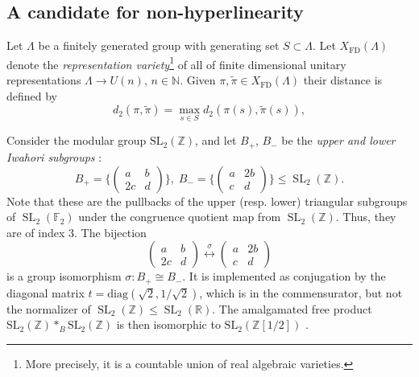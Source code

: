 \documentclass[11pt]{amsart}
\DeclareMathOperator{\SL}{SL}
\newcommand{\R}{{\mathbb{R}}}
\newcommand{\N}{{\mathbb{N}}}
\newcommand{\Z}{{\mathbb{Z}}}
\theoremstyle{definition}
\theoremstyle{remark}
\theoremstyle{definition}
\begin{document}
\subsection*{A candidate for non-hyperlinearity} \label{sec:prologue}





Let $\Lambda$ be a finitely generated group with generating set $S \subset \Lambda$. Let $X_{\mathrm{FD}}(\Lambda)$ denote the \emph{representation variety}\footnote{More precisely, it is  a countable union of real algebraic varieties.} of all of finite
dimensional unitary representations $\Lambda\to U(n)$, $n\in \N$.%
Given $\pi, \tilde \pi \in X_{\mathrm{FD}}(\Lambda)$ their distance is defined by
\[
       d_2(\pi,\tilde{\pi})= \max_{s\in S} d_2(\pi(s), \tilde\pi(s)),
\]


Consider the modular group $ \mathrm{SL}_{2}(\Z)$, and
let ${B}_{+}$, ${B}_{-}$ be the \emph{upper and lower Iwahori subgroups} \cite[Section 1.2]{serre2002trees}:
$${B}_+ = \big\{  \left(\begin{array}{cc} 
a & b\\
2c & d
\end{array}\right) \big \}, \; B_-=\big\{  \left(\begin{array}{cc} 
a &2 b\\
c & d
\end{array}\right) \big \} \leq \SL_2(\Z). $$
Note that these are the pullbacks of the upper (resp. lower) triangular subgroups of $\SL_2(\mathbb F_2)$ under the congruence quotient map from $\SL_2(\Z)$.
Thus, they are of index $3$.
The   bijection
\[
\left(\begin{array}{cc}
a & b\\
2c & d
\end{array}\right)
\overset{\sigma}{\longleftrightarrow}
\left(\begin{array}{cc}
a & 2b\\
c & d
\end{array}\right)
\]
 is a group isomorphism  $\sigma:{B}_{+} \cong {B}_{-}$. It is implemented as conjugation by the diagonal matrix $t=\mathrm{diag}(\sqrt 2,1/\sqrt 2)$, which is in the commensurator, but not the normalizer of $\SL_2(\Z) \leq \SL_2(\R)$.
 The amalgamated free product $\mathrm{SL}_2(\Z )*_{ B}\mathrm{SL}_2(\Z )$ is then isomorphic to $\mathrm{SL}_2(\Z[1/2])$ \cite[\S II.1, Cor. 2]{serre2002trees}.
\end{document}
